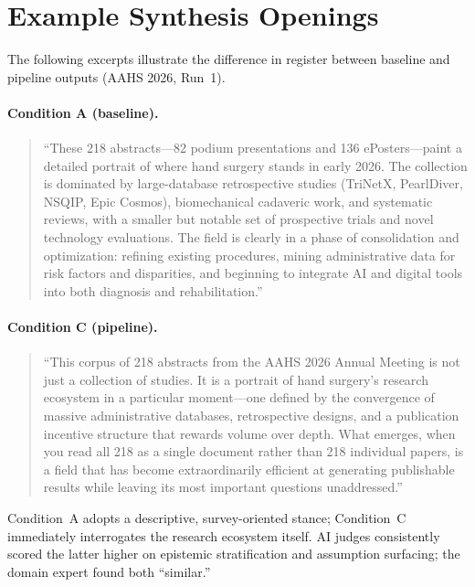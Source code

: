 \documentclass{article}
\begin{document}
\section{Example Synthesis Openings}
\label{app:examples}

The following excerpts illustrate the difference in register between baseline and pipeline outputs (AAHS 2026, Run~1).

\paragraph{Condition A (baseline).}
\begin{quote}
``These 218 abstracts---82 podium presentations and 136 ePosters---paint a detailed portrait of where hand surgery stands in early 2026. The collection is dominated by large-database retrospective studies (TriNetX, PearlDiver, NSQIP, Epic Cosmos), biomechanical cadaveric work, and systematic reviews, with a smaller but notable set of prospective trials and novel technology evaluations. The field is clearly in a phase of consolidation and optimization: refining existing procedures, mining administrative data for risk factors and disparities, and beginning to integrate AI and digital tools into both diagnosis and rehabilitation.''
\end{quote}

\paragraph{Condition C (pipeline).}
\begin{quote}
``This corpus of 218 abstracts from the AAHS 2026 Annual Meeting is not just a collection of studies. It is a portrait of hand surgery's research ecosystem in a particular moment---one defined by the convergence of massive administrative databases, retrospective designs, and a publication incentive structure that rewards volume over depth. What emerges, when you read all 218 as a single document rather than 218 individual papers, is a field that has become extraordinarily efficient at generating publishable results while leaving its most important questions unaddressed.''
\end{quote}

Condition~A adopts a descriptive, survey-oriented stance; Condition~C immediately interrogates the research ecosystem itself. AI judges consistently scored the latter higher on epistemic stratification and assumption surfacing; the domain expert found both ``similar.''
\end{document}

